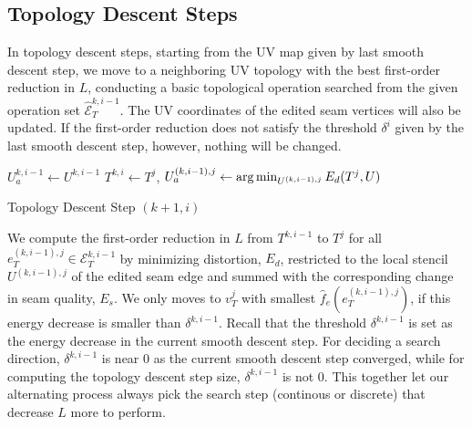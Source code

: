 
\subsection{Topology Descent Steps}
\label{sec:topologyStep}

In topology descent steps, starting from the UV map given by last smooth descent step, we move to a neighboring UV topology with the best first-order reduction in $L$, conducting a basic topological operation searched from the given operation set $\hat{\mathcal{E}}^{k,i-1}_T$. The UV coordinates of the edited seam vertices will also be updated. If the first-order reduction does not satisfy the threshold $\delta^i$ given by the last smooth descent step, however, nothing will be changed.

\begin{algorithm}[h]
\SetAlgoLined
{}
$U_a^{k,i-1} \leftarrow U^{k,i-1}$\;
{
  $T^{k,i} \leftarrow T^j$, $U_a^{(k,i-1),j} \leftarrow \operatorname*{arg\,min}_{U^{(k,i-1),j}} E_d(T^j,U)$\;
}
\caption{Topology Descent Step $(k+1,i)$}
\end{algorithm}
 
We compute the first-order reduction  in $L$ from $T^{k,i-1}$ to $T^j$ for all $e^{(k,i-1),j}_T \in \mathcal{E}^{k,i-1}_T$ by minimizing distortion, $E_d$, restricted to the local stencil $U^{(k,i-1),j}$ of the edited seam edge and summed with the corresponding change in seam quality, $E_s$. We only moves to  $v^j_T$ with smallest $\hat{f}_e(e^{(k,i-1),j}_{T})$, if this energy decrease is smaller than $\delta^{k,i-1}$. Recall that the threshold $\delta^{k,i-1}$ is set as the energy decrease in the current smooth descent step. For deciding a search direction, $\delta^{k,i-1}$ is near $0$ as the current smooth descent step converged, while for computing the topology descent step size, $\delta^{k,i-1}$ is not $0$. This together let our alternating process always pick the search step (continous or discrete) that decrease $L$ more to perform.

